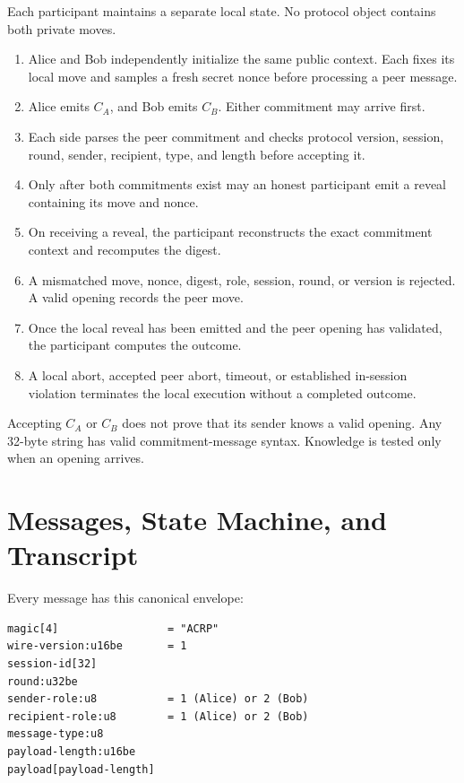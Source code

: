 Each participant maintains a separate local state. No protocol object contains
both private moves.

\begin{enumerate}
    \item Alice and Bob independently initialize the same public context. Each
    fixes its local move and samples a fresh secret nonce before processing a
    peer message.
    \item Alice emits \(C_A\), and Bob emits \(C_B\). Either commitment may
    arrive first.
    \item Each side parses the peer commitment and checks protocol version,
    session, round, sender, recipient, type, and length before accepting it.
    \item Only after both commitments exist may an honest participant emit a
    reveal containing its move and nonce.
    \item On receiving a reveal, the participant reconstructs the exact
    commitment context and recomputes the digest.
    \item A mismatched move, nonce, digest, role, session, round, or version is
    rejected. A valid opening records the peer move.
    \item Once the local reveal has been emitted and the peer opening has
    validated, the participant computes the outcome.
    \item A local abort, accepted peer abort, timeout, or established in-session
    violation terminates the local execution without a completed outcome.
\end{enumerate}

Accepting \(C_A\) or \(C_B\) does not prove that its sender knows a valid
opening. Any 32-byte string has valid commitment-message syntax. Knowledge is
tested only when an opening arrives.

\section{Messages, State Machine, and Transcript}

Every message has this canonical envelope:

\begin{verbatim}
magic[4]                 = "ACRP"
wire-version:u16be       = 1
session-id[32]
round:u32be
sender-role:u8           = 1 (Alice) or 2 (Bob)
recipient-role:u8        = 1 (Alice) or 2 (Bob)
message-type:u8
payload-length:u16be
payload[payload-length]
\end{verbatim}

